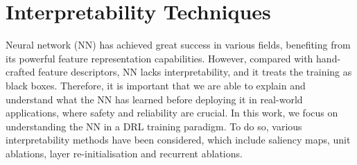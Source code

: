 \section{Interpretability Techniques}
Neural network (NN) has achieved great success in various fields, benefiting from its powerful feature representation capabilities. However, compared with hand-crafted feature descriptors, NN lacks interpretability, and it treats the training as black boxes. Therefore, it is important that we are able to explain and understand what the NN has learned before deploying it in real-world applications, where safety and reliability are crucial. In this work, we focus on understanding the NN in a DRL training paradigm. To do so, various interpretability methods have been considered, which include saliency maps, unit ablations, layer re-initialisation and recurrent ablations. 
\label{ch6:sec_interp}
